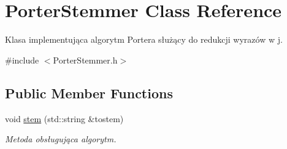 \hypertarget{class_porter_stemmer}{}\section{Porter\+Stemmer Class Reference}
\label{class_porter_stemmer}


Klasa implementująca algorytm Portera służący do redukcji wyrazów w j.  




{\ttfamily \#include $<$Porter\+Stemmer.\+h$>$}

\subsection*{Public Member Functions}
\begin{DoxyCompactItemize}
\item 
void \mbox{\hyperlink{class_porter_stemmer_a2bbf1c12f88524ebfed18836dd09b0cc}{stem}} (std\+::string \&tostem)
\begin{DoxyCompactList}\small\item\em Metoda obsługująca algorytm. \end{DoxyCompactList}\end{DoxyCompactItemize}
